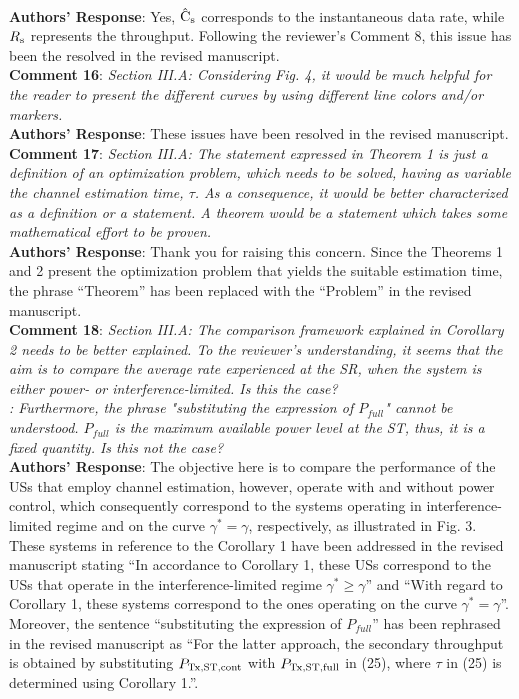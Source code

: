 \documentclass[12pt,a4wide,peerreview]{IEEEtran}
\newcommand{\tc}[1]{#1}
\begin{document}
\\
\textbf{Authors' Response}:
Yes, $\hat{\text{{C}}}_{\text{s}}$ corresponds to the instantaneous data rate, while $R_{\text{s}}$ represents the throughput. Following the reviewer's Comment 8, this issue has been the resolved in the revised manuscript. \\
\textbf{\tc{Comment 16}}: 
\textit{
Section III.A: Considering Fig. 4, it would be much helpful for the reader to present the different curves by using different line colors and/or markers.
}
\\
\textbf{Authors' Response}:
These issues have been resolved in the revised manuscript.
\\
\textbf{\tc{Comment 17}}: 
\textit{
Section III.A: The statement expressed in Theorem 1 is just a definition of an optimization problem, which needs to be solved, having as variable the channel estimation time, $\tau$. As a consequence, it would be better characterized as a definition or a statement. A theorem would be a statement which takes some mathematical effort to be proven.
}
\\
\textbf{Authors' Response}:
Thank you for raising this concern. Since the Theorems 1 and 2 present the optimization problem that yields the suitable estimation time, the phrase ``Theorem'' has been replaced with the ``Problem'' in the revised manuscript. 
\\
\textbf{\tc{Comment 18}}: 
\textit{
Section III.A: The comparison framework explained in Corollary 2 needs to be better explained. To the reviewer's understanding, it seems that the aim is to compare the average rate experienced at the SR, when the system is either power- or interference-limited. Is this the case? \\:
Furthermore, the phrase "substituting the expression of $P_{full}$" cannot be understood. $P_{full}$ is the maximum available power level at the ST, thus, it is a fixed quantity. Is this not the case?
}
\\
\textbf{Authors' Response}:
The objective here is to compare the performance of the USs that employ channel estimation, however, operate with and without power control, which consequently correspond to the systems operating in interference-limited regime and on the curve $\gamma^* = \gamma$, respectively, as illustrated in Fig. 3. These systems in reference to the Corollary 1 have been addressed in the revised manuscript stating ``In accordance to Corollary 1, these USs correspond to the USs that operate in the interference-limited regime $\gamma^* \ge \gamma $'' and ``With regard to Corollary 1, these systems correspond to the ones operating on the curve $\gamma^*  = \gamma$''. Moreover, the sentence ``substituting the expression of $P_{full}$'' has been rephrased in the revised manuscript as ``For the latter approach, the secondary throughput is obtained by substituting $P_{\text{Tx,ST,cont}}$ with $P_{\text{Tx,ST,full}}$ in (25), where $\tau$ in (25) is determined using Corollary 1.''. 
\end{document}
